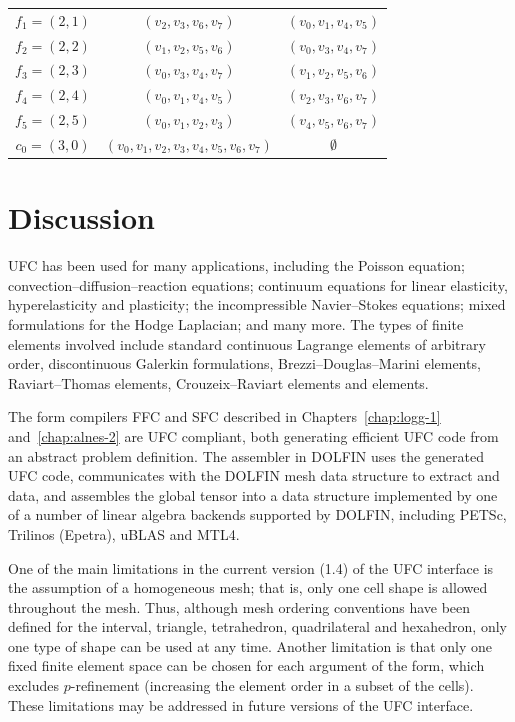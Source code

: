 \begin{center}
\begin{tabular}{ccc}
    $f_1 = (2, 1)$ & $(v_2, v_3, v_6, v_7)$ & $(v_0, v_1, v_4, v_5)$ \\
    $f_2 = (2, 2)$ & $(v_1, v_2, v_5, v_6)$ & $(v_0, v_3, v_4, v_7)$ \\
    $f_3 = (2, 3)$ & $(v_0, v_3, v_4, v_7)$ & $(v_1, v_2, v_5, v_6)$ \\
    $f_4 = (2, 4)$ & $(v_0, v_1, v_4, v_5)$ & $(v_2, v_3, v_6, v_7)$ \\
    $f_5 = (2, 5)$ & $(v_0, v_1, v_2, v_3)$ & $(v_4, v_5, v_6, v_7)$ \\
    $c_0 = (3, 0)$ & $(v_0, v_1, v_2, v_3, v_4, v_5, v_6, v_7)$ & $\emptyset$ \\
    \toprule
  \end{tabular}
\end{center}


\section{Discussion}

UFC has been used for many applications, including the Poisson
equation; convection--diffusion--reaction equations; continuum
equations for linear elasticity, hyperelasticity and plasticity; the
incompressible Navier--Stokes equations; mixed formulations for the
Hodge Laplacian; and many more. The types of finite elements involved
include standard continuous Lagrange elements of arbitrary order,
discontinuous Galerkin formulations, Brezzi--Douglas--Marini elements,
Raviart--Thomas elements, Crouzeix--Raviart elements and \nedelec{}
elements.

The form compilers FFC and SFC described in Chapters~\ref{chap:logg-1}
and~\ref{chap:alnes-2} are UFC compliant, both generating efficient
UFC code from an abstract problem definition. The assembler in DOLFIN
uses the generated UFC code, communicates with the DOLFIN mesh data
structure to extract  and  data, and
assembles the global tensor into a data structure implemented by one
of a number of linear algebra backends supported by DOLFIN, including
PETSc, Trilinos (Epetra), uBLAS and MTL4.

One of the main limitations in the current version (1.4) of the UFC
interface is the assumption of a homogeneous mesh; that is, only one
cell shape is allowed throughout the mesh. Thus, although mesh
ordering conventions have been defined for the interval, triangle,
tetrahedron, quadrilateral and hexahedron, only one type of shape can
be used at any time. Another limitation is that only one fixed finite
element space can be chosen for each argument of the form, which
excludes $p$-refinement (increasing the element order in a subset of
the cells). These limitations may be addressed in future versions of
the UFC interface.

